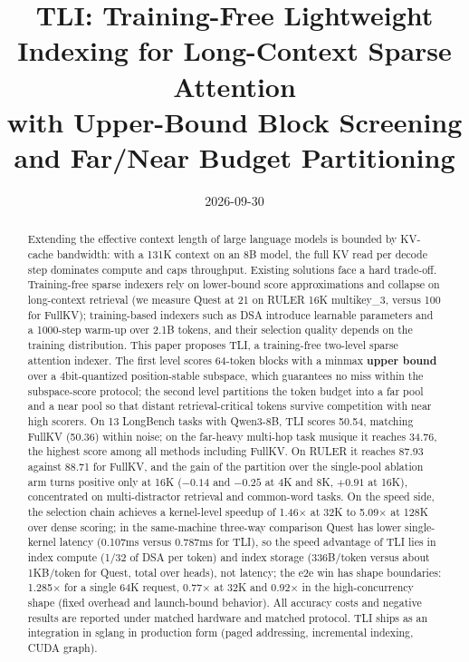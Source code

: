 \documentclass[11pt]{article}
\title{TLI: Training-Free Lightweight Indexing for Long-Context Sparse Attention\\
\large with Upper-Bound Block Screening and Far/Near Budget Partitioning}
\date{2026-09-30}
\begin{document}
\maketitle

\begin{abstract}
Extending the effective context length of large language models is bounded by KV-cache bandwidth: with a 131K context on an 8B model, the full KV read per decode step dominates compute and caps throughput. Existing solutions face a hard trade-off. Training-free sparse indexers rely on lower-bound score approximations and collapse on long-context retrieval (we measure Quest at 21 on RULER 16K multikey\_3, versus 100 for FullKV); training-based indexers such as DSA introduce learnable parameters and a 1000-step warm-up over 2.1B tokens, and their selection quality depends on the training distribution. This paper proposes TLI, a training-free two-level sparse attention indexer. The first level scores 64-token blocks with a minmax \textbf{upper bound} over a 4bit-quantized position-stable subspace, which guarantees no miss within the subspace-score protocol; the second level partitions the token budget into a far pool and a near pool so that distant retrieval-critical tokens survive competition with near high scorers. On 13 LongBench tasks with Qwen3-8B, TLI scores 50.54, matching FullKV (50.36) within noise; on the far-heavy multi-hop task musique it reaches 34.76, the highest score among all methods including FullKV. On RULER it reaches 87.93 against 88.71 for FullKV, and the gain of the partition over the single-pool ablation arm turns positive only at 16K ($-0.14$ and $-0.25$ at 4K and 8K, $+0.91$ at 16K), concentrated on multi-distractor retrieval and common-word tasks. On the speed side, the selection chain achieves a kernel-level speedup of 1.46$\times$ at 32K to 5.09$\times$ at 128K over dense scoring; in the same-machine three-way comparison Quest has lower single-kernel latency (0.107ms versus 0.787ms for TLI), so the speed advantage of TLI lies in index compute (1/32 of DSA per token) and index storage (336B/token versus about 1KB/token for Quest, total over heads), not latency; the e2e win has shape boundaries: 1.285$\times$ for a single 64K request, 0.77$\times$ at 32K and 0.92$\times$ in the high-concurrency shape (fixed overhead and launch-bound behavior). All accuracy costs and negative results are reported under matched hardware and matched protocol. TLI ships as an integration in sglang in production form (paged addressing, incremental indexing, CUDA graph).
\end{abstract}
\end{document}
